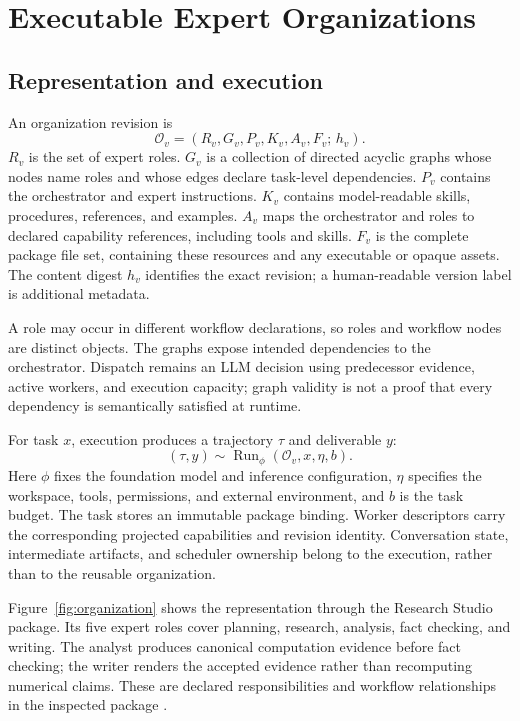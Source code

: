 \section{Executable Expert Organizations}\label{sec:organization}
\subsection{Representation and execution}
An organization revision is
\begin{equation}
\mathcal O_v=(R_v,G_v,P_v,K_v,A_v,F_v;\,h_v).
\label{eq:organization}
\end{equation}
$R_v$ is the set of expert roles. $G_v$ is a collection of directed acyclic graphs whose nodes name roles and whose edges declare task-level dependencies. $P_v$ contains the orchestrator and expert instructions. $K_v$ contains model-readable skills, procedures, references, and examples. $A_v$ maps the orchestrator and roles to declared capability references, including tools and skills. $F_v$ is the complete package file set, containing these resources and any executable or opaque assets. The content digest $h_v$ identifies the exact revision; a human-readable version label is additional metadata.

A role may occur in different workflow declarations, so roles and workflow nodes are distinct objects. The graphs expose intended dependencies to the orchestrator. Dispatch remains an LLM decision using predecessor evidence, active workers, and execution capacity; graph validity is not a proof that every dependency is semantically satisfied at runtime.

For task $x$, execution produces a trajectory $\tau$ and deliverable $y$:
\begin{equation}
(\tau,y)\sim \operatorname{Run}_{\phi}
   (\mathcal O_v,x,\eta,b).
\label{eq:run}
\end{equation}
Here $\phi$ fixes the foundation model and inference configuration, $\eta$ specifies the workspace, tools, permissions, and external environment, and $b$ is the task budget. The task stores an immutable package binding. Worker descriptors carry the corresponding projected capabilities and revision identity. Conversation state, intermediate artifacts, and scheduler ownership belong to the execution, rather than to the reusable organization.

Figure~\ref{fig:organization} shows the representation through the Research Studio package. Its five expert roles cover planning, research, analysis, fact checking, and writing. The analyst produces canonical computation evidence before fact checking; the writer renders the accepted evidence rather than recomputing numerical claims. These are declared responsibilities and workflow relationships in the inspected package \citep{ocsource}.

